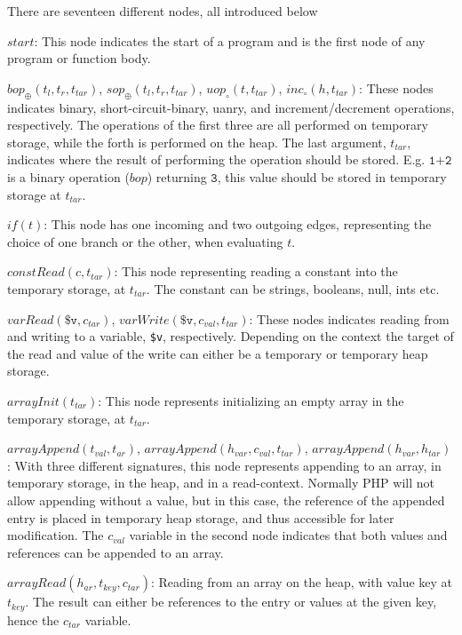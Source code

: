 There are seventeen different nodes, all introduced below
\begin{description}
\item{$\mathit{start}$:} This node indicates the start of a program and is the first node of any program or function body. 
\item{$\mathit{bop_{\oplus}}(t_l,t_r, t_{tar})$, $\mathit{sop_{\oplus}}(t_l,t_r, t_{tar})$, $\mathit{uop_{\circ}}(t, t_{tar})$, $\mathit{inc_{\circ}}(h, t_{tar})$:} These nodes indicates binary, short-circuit-binary, uanry, and increment/decrement operations, respectively. The operations of the first three are all performed on temporary storage, while the forth is performed on the heap. The last argument, $t_{tar}$, indicates where the result of performing the operation should be stored. E.g. $\texttt{1+2}$ is a binary operation ($\mathit{bop}$) returning $\texttt{3}$, this value should be stored in temporary storage at $t_{tar}$. 
\item{$\mathit{if}(t)$:} This node has one incoming and two outgoing edges, representing the choice of one branch or the other, when evaluating $t$. 
\item{$\mathit{constRead}(c, t_{tar})$:} This node representing reading a constant into the temporary storage, at $t_{tar}$. The constant can be strings, booleans, null, ints etc.
\item{$\mathit{varRead}(\texttt{\$v}, c_{tar})$, $\mathit{varWrite}(\texttt{\$v}, c_{val}, t_{tar})$:} These nodes indicates reading from and writing to a variable, \texttt{\$v}, respectively. Depending on the context the target of the read and value of the write can either be a temporary or temporary heap storage. 
\item{$\mathit{arrayInit}(t_{tar})$:} This node represents initializing an empty array in the temporary storage, at $t_{tar}$.
\item{$\mathit{arrayAppend}(t_{val}, t_{ar})$, $\mathit{arrayAppend}(h_{var}, c_{val}, t_{tar})$, $\mathit{arrayAppend}(h_{var}, h_{tar})$:} With three different signatures, this node represents appending to an array, in temporary storage, in the heap, and in a read-context. Normally PHP will not allow appending without a value, but in this case, the reference of the appended entry is placed in temporary heap storage, and thus accessible for later modification. The $c_{val}$ variable in the second node indicates that both values and references can be appended to an array.
\item{$\mathit{arrayRead}(h_{ar}, t_{key}, c_{tar})$:} Reading from an array on the heap, with value key at $t_{key}$. The result can either be references to the entry or values at the given key, hence the $c_{tar}$ variable. 

\end{description}
